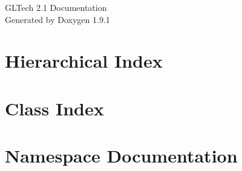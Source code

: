 \let\mypdfximage\pdfximage\def\pdfximage{\immediate\mypdfximage}\documentclass[twoside]{book}
\newcommand{\+}{\discretionary{\mbox{\scriptsize$\hookleftarrow$}}{}{}}
\newcommand{\clearemptydoublepage}{%
  \newpage{\pagestyle{empty}\cleardoublepage}%
}
\begin{document}
\raggedbottom

\hypersetup{pageanchor=false,
             bookmarksnumbered=true,
             pdfencoding=unicode
            }
\begin{titlepage}
\vspace*{7cm}
\begin{center}%
{\Large GLTech 2.1 Documentation }\\
\vspace*{1cm}
{\large Generated by Doxygen 1.9.1}\\
\end{center}
\end{titlepage}
\clearemptydoublepage
{}
\tableofcontents
\clearemptydoublepage
{}
\hypersetup{pageanchor=true}

\chapter{Hierarchical Index}

\chapter{Class Index}

\chapter{Namespace Documentation}






\end{document}
